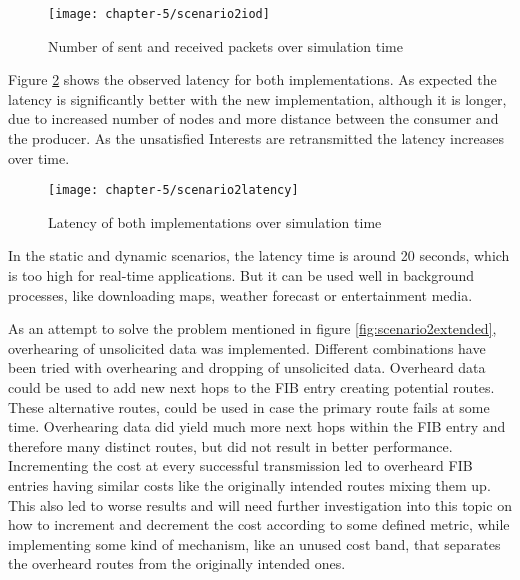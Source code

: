 \clearpage

\begin{figure}[H]
  \centering
  \texttt{[image: chapter-5/scenario2iod]}
  \caption{Number of sent and received packets over simulation time}
  \label{fig:scenario2iod}
\end{figure}

\vspace{5mm} %

Figure \ref{fig:scenario2latency} shows the observed latency for both implementations. As expected the latency is significantly better with the new implementation, although it is longer, due to increased number of nodes and more distance between the consumer and the producer. As the unsatisfied Interests are retransmitted the latency increases over time.

\clearpage

\vspace{5mm} %

\begin{figure}[H]
  \centering
  \texttt{[image: chapter-5/scenario2latency]}
  \caption{Latency of both implementations over simulation time}
  \label{fig:scenario2latency}
\end{figure}

\vspace{5mm} %

In the static and dynamic scenarios, the latency time is around 20 seconds, which is too high for real-time applications. But it can be used well in background processes, like downloading maps, weather forecast or entertainment media.

As an attempt to solve the problem mentioned in figure \ref{fig:scenario2extended}, overhearing of unsolicited data was implemented. Different combinations have been tried with overhearing and dropping of unsolicited data. Overheard data could be used to add new next hops to the FIB entry creating potential routes. These alternative routes, could be used in case the primary route fails at some time. Overhearing data did yield much more next hops within the FIB entry and therefore many distinct routes, but did not result in better performance. Incrementing the cost at every successful transmission led to overheard FIB entries having similar costs like the originally intended routes mixing them up. This also led to worse results and will need further investigation into this topic on how to increment and decrement the cost according to some defined metric, while implementing some kind of mechanism, like an unused cost band, that separates the overheard routes from the originally intended ones.


